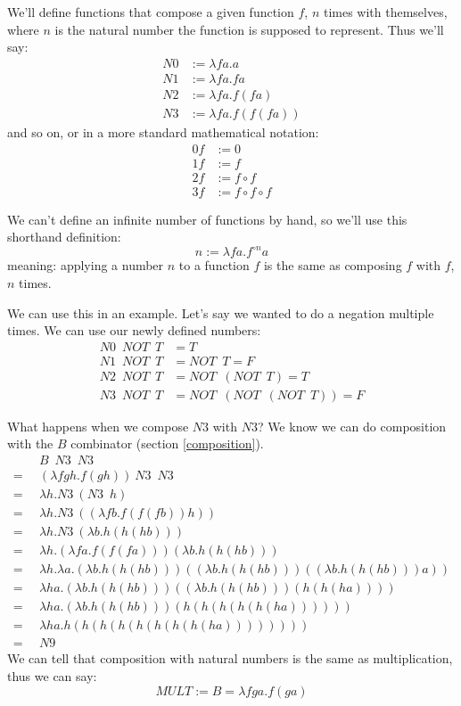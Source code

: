 \documentclass[11pt]{article}
\begin{document}
We'll define functions that compose a given function \(f\), \(n\) times with
themselves, where \(n\) is the natural number the function is supposed to
represent. Thus we'll say:
\begin{align*}
	N0&:=\lambda fa.a\\
	N1&:=\lambda fa.fa\\
	N2&:=\lambda fa.f(fa)\\
	N3&:=\lambda fa.f(f(fa))
\end{align*}
and so on, or in a more standard mathematical notation:
\begin{align*}
	0f&:=0\\
	1f&:=f\\
	2f&:=f\circ f\\
	3f&:=f\circ f\circ f
\end{align*}

We can't define an infinite number of functions by hand, so we'll use this
shorthand definition:
\[n:=\lambda fa.f^{\circ n}a\]
meaning: applying a number \(n\) to a function \(f\) is the same as composing
\(f\) with \(f\), \(n\) times.

We can use this in an example. Let's say we wanted to do a negation multiple
times. We can use our newly defined numbers:
\begin{align*}
	N0\enspace NOT\enspace T &= T\\
	N1\enspace NOT\enspace T &= NOT\enspace T = F\\
	N2\enspace NOT\enspace T &= NOT\enspace (NOT\enspace T) = T\\
	N3\enspace NOT\enspace T &= NOT\enspace (NOT\enspace (NOT\enspace T))=F
\end{align*}

What happens when we compose \(N3\) with \(N3\)? We know we can do composition
with the \(B\) combinator (section \ref{composition}).
\begin{align*}
	&\enspace B\enspace N3\enspace N3\\
	=&\enspace(\lambda fgh.f(gh))\:N3\enspace N3\\
	=&\enspace\lambda h.N3\:(N3\enspace h)\\
	=&\enspace\lambda h.N3\:((\lambda fb.f(f(fb))h))\\
	=&\enspace\lambda h.N3\:(\lambda b.h(h(hb)))\\
	=&\enspace\lambda h.(\lambda fa.f(f(fa)))(\lambda b.h(h(hb)))\\
	=&\enspace\lambda h.\lambda a.
		(\lambda b.h(h(hb)))((\lambda b.h(h(hb)))((\lambda b.h(h(hb)))a))\\
	=&\enspace\lambda ha.(\lambda b.h(h(hb)))((\lambda b.h(h(hb)))(h(h(ha))))\\
	=&\enspace\lambda ha.(\lambda b.h(h(hb)))(h(h(h(h(h(ha))))))\\
	=&\enspace\lambda ha.h(h(h(h(h(h(h(h(ha))))))))\\
	=&\enspace N9
\end{align*}
We can tell that composition with natural numbers is the same as
multiplication, thus we can say:
\[MULT:=B=\lambda fga.f(ga)\]
\end{document}
